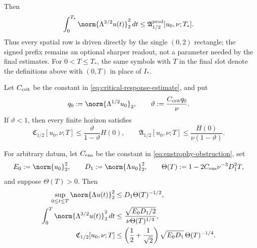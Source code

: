 Then
\begin{equation}
 \int_0^{T_*}\norm{\Lambda^{3/2}u(t)}_2^2\,dt
 \le \mathfrak A_{1/2}^{\rm prod}[u_0,\nu;T_*].
 \label{eq:producer-critical-coefficient-bound}
\end{equation}
Thus every spatial row is driven directly by the single \((0,2)\) rectangle;
the signed prefix remains an optional sharper readout, not a parameter needed
by the final estimates.
For \(0<T\le T_*\), the same symbols with \(T\) in the final slot denote
the definitions above with \((0,T)\) in place of \(I_*\).

\begin{proposition}
\label{prop:critical-coefficient-calibrations}
Let \(C_{\rm crit}\) be the constant in
\eqref{eq:critical-response-estimate}, and put
\[
 q_0:=\norm{\Lambda^{1/2}u_0}_2,
 \qquad
 \vartheta:=\frac{C_{\rm crit}q_0}{\nu}.
\]
If \(\vartheta<1\), then every finite horizon satisfies
\begin{equation}
 \mathfrak C_{1/2}[u_0,\nu;T]
 \le\frac{\vartheta}{1-\vartheta}H(0),
 \qquad
 \mathfrak A_{1/2}[u_0,\nu;T]
 \le\frac{H(0)}{\nu(1-\vartheta)}.
 \label{eq:small-critical-coefficient}
\end{equation}

For arbitrary datum, let \(C_{\rm ens}\) be the constant in
\eqref{eq:enstrophy-obstruction}, set
\[
 E_0:=\norm{u_0}_2^2,
 \qquad
 D_1:=\norm{\Lambda u_0}_2^2,
 \qquad
 \Theta(T):=1-2C_{\rm ens}\nu^{-3}D_1^2T,
\]
and suppose \(\Theta(T)>0\).  Then
\begin{align}
 \sup_{0\le t\le T}\norm{\Lambda u(t)}_2^2
 &\le D_1\Theta(T)^{-1/2},
 \label{eq:local-enstrophy-envelope}\\
 \int_0^T\norm{\Lambda^{3/2}u(t)}_2^2\,dt
 &\le\frac{\sqrt{E_0D_1/2}}
 {\nu\Theta(T)^{1/4}},
 \label{eq:local-critical-action}\\
 \mathfrak C_{1/2}[u_0,\nu;T]
 &\le\left(\frac12+\frac1{\sqrt2}\right)
 \sqrt{E_0D_1}\,\Theta(T)^{-1/4}.
 \label{eq:local-critical-prefix}
\end{align}
\end{proposition}

